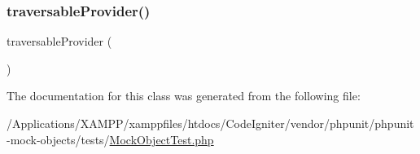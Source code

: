 \subsubsection{\texorpdfstring{traversable\+Provider()}{traversableProvider()}}
{\footnotesize\ttfamily traversable\+Provider (\begin{DoxyParamCaption}{ }\end{DoxyParamCaption})}



The documentation for this class was generated from the following file\+:\begin{DoxyCompactItemize}
\item 
/\+Applications/\+X\+A\+M\+P\+P/xamppfiles/htdocs/\+Code\+Igniter/vendor/phpunit/phpunit-\/mock-\/objects/tests/\mbox{\hyperlink{_mock_object_test_8php}{Mock\+Object\+Test.\+php}}\end{DoxyCompactItemize}
